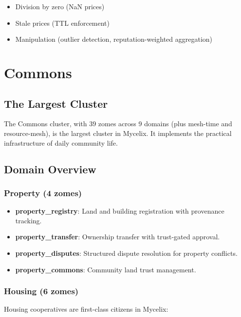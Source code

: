 \documentclass[12pt]{book}
\begin{document}
\begin{itemize}
  \item Division by zero (NaN prices)
  \item Stale prices (TTL enforcement)
  \item Manipulation (outlier detection, reputation-weighted aggregation)
\end{itemize}


\chapter{Commons}

\section{The Largest Cluster}

The Commons cluster, with 39 zomes across 9 domains (plus mesh-time and
resource-mesh), is the largest cluster in Mycelix. It implements the practical
infrastructure of daily community life.

\section{Domain Overview}

\subsection{Property (4 zomes)}

\begin{itemize}
  \item \textbf{property\_registry}: Land and building registration with
    provenance tracking.
  \item \textbf{property\_transfer}: Ownership transfer with trust-gated
    approval.
  \item \textbf{property\_disputes}: Structured dispute resolution for property
    conflicts.
  \item \textbf{property\_commons}: Community land trust management.
\end{itemize}

\subsection{Housing (6 zomes)}

Housing cooperatives are first-class citizens in Mycelix:
\end{document}
